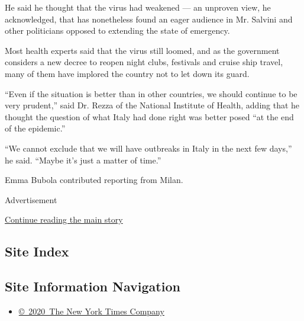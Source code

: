 He said he thought that the virus had weakened --- an unproven view, he
acknowledged, that has nonetheless found an eager audience in Mr.
Salvini and other politicians opposed to extending the state of
emergency.

Most health experts said that the virus still loomed, and as the
government considers a new decree to reopen night clubs, festivals and
cruise ship travel, many of them have implored the country not to let
down its guard.

``Even if the situation is better than in other countries, we should
continue to be very prudent,'' said Dr. Rezza of the National Institute
of Health, adding that he thought the question of what Italy had done
right was better posed ``at the end of the epidemic.''

``We cannot exclude that we will have outbreaks in Italy in the next few
days,'' he said. ``Maybe it's just a matter of time.''

Emma Bubola contributed reporting from Milan.

Advertisement

\protect\hyperlink{after-bottom}{Continue reading the main story}

\hypertarget{site-index}{%
\subsection{Site Index}\label{site-index}}

\hypertarget{site-information-navigation}{%
\subsection{Site Information
Navigation}\label{site-information-navigation}}

\begin{itemize}
\tightlist
\item
  \href{https://help.nytimes3xbfgragh.onion/hc/en-us/articles/115014792127-Copyright-notice}{©~2020~The
  New York Times Company}
\end{itemize}

